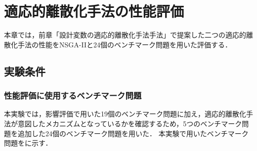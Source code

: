 \documentclass[../main/main]{subfiles}
\begin{document}
\chapter{適応的離散化手法の性能評価}
本章では，前章「設計変数の適応的離散化手法手法」で提案した二つの適応的離散化手法の性能をNSGA-IIと24個のベンチマーク問題を用いた評価する．

\section{実験条件}
\subsection{性能評価に使用するベンチマーク問題}
本実験では，影響評価で用いた19個のベンチマーク問題に加え，適応的離散化手法が意図したメカニズムとなっているかを確認するため，5つのベンチマーク問題を追加した24個のベンチマーク問題を用いた．
本実験で用いたベンチマーク問題をに示す．
\end{document}
